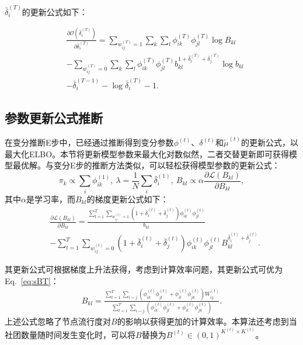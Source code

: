 $\bar{\delta}_i^{(T)}$的更新公式如下：



\begin{equation}
\begin{split}
& \frac{\partial \mathscr{O}(\bar{\delta}_i^{(T)})}{\partial \bar{\delta}_i^{(T)}}  = \sum_{w_{ij}^{(T)}=1} \sum_k \sum_l \phi_{ik}^{(T)}\phi_{jl}^{(T)} \log B_{kl} \\
& -\sum_{w_{ij}^{(T)}=0} \sum_k \sum_l \phi_{ik}^{(T)}\phi_{jl}^{(T)}  b_{kl}^{1+\bar{\delta}_i^{(T)}+\bar{\delta}_j^{(T)}} \log b_{kl} \\
&  -\bar{\delta}_i^{(T-1)} - \log \bar{\delta}_i^{(T)} -1.
\end{split}
\label{eq:deltaT}
\end{equation}

\subsection{参数更新公式推断}
在变分推断E步中，已经通过推断得到变分参数$\phi^{(t)}$、$\delta^{(t)}$和$\tilde{\mu}^{(t)}$的更新公式，以最大化ELBO。本节将更新模型参数来最大化对数似然，二者交替更新即可获得模型最优解。与变分E步的推断方法类似，可以轻松获得模型参数的更新公式：
\begin{equation}
\pi_k \propto \sum_i \phi_{ik}^{(1)},~\lambda = \frac{1}{N} \sum_i \bar{\delta}_i^{(1)},~B_{kl} \propto \alpha \frac{\partial \mathscr{L}(B_{kl})}{\partial B_{kl}},
\label{eq:pi}
\end{equation}
其中$\alpha$是学习率，而$B_{kl}$的梯度更新公式如下：
\begin{align}
& \frac{\partial \mathscr{L}(B_{kl})}{\partial B_{kl}}= \frac{\sum_{t=1}^T \sum_{w_{ij}^{(t)}=1}(1+\bar{\delta}_i^{(t)}+\bar{\delta}_j^{(t)}) \phi_{ik}^{(t)} \phi_{jl}^{(t)}}{b_{kl}}\nonumber \\
& -\sum_{t=1}^T \sum_{w_{ij}^{(t)}=0}(1+\bar{\delta}_i^{(t)}+\bar{\delta}_j^{(t)}) \phi_{ik}^{(t)} \phi_{jl}^{(t)} B_{kl}^{ \bar{\delta}_i^{(t)}+\bar{\delta}_j^{(t)}}.
\label{eq:B}
\end{align}

其更新公式可根据梯度上升法获得，考虑到计算效率问题，其更新公式可优为Eq.~\ref{eq:sBT}：
\begin{equation}
\begin{split}
{B}_{kl}= \frac{\sum_{t=1}^{T} \sum_{i \sim j} (\phi_{ik}^{(t)}\phi_{jl}^{(t)}+ \phi_{il}^{(t)}\phi_{jk}^{(t)}) W^{(t)}_{ij}}{\sum_{t=1}^{T} \sum_{i \sim j} (\phi_{ik}^{(t)}\phi_{jl}^{(t)}+ \phi_{il}^{(t)}\phi_{jk}^{(t)}) }.
\end{split}
\label{eq:sBT}
\end{equation}
上述公式忽略了节点流行度对$B$的影响以获得更加的计算效率。本算法还考虑到当社团数量随时间发生变化时，可以将$B$替换为$B^{(t)} \in (0, 1)^{K^{(t)} \times K^{(t)}}$。

